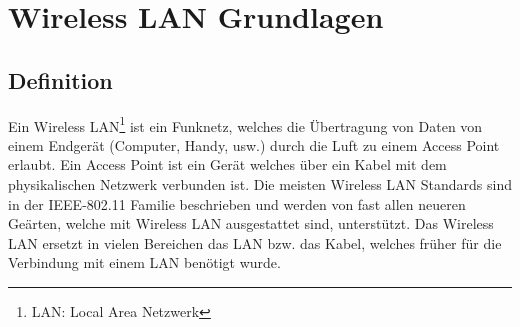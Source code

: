 \chapter{Wireless LAN Grundlagen}
\label{sec:TheoretischeGrundlagen}

\section{Definition}
Ein Wireless LAN\footnote{LAN: Local Area Netzwerk} ist ein Funknetz, welches die Übertragung von Daten von einem Endgerät (Computer, Handy, usw.) durch die Luft zu einem Access Point erlaubt. Ein Access Point ist ein Gerät welches über ein Kabel mit dem physikalischen Netzwerk verbunden ist. Die meisten Wireless LAN Standards sind in der IEEE-802.11 Familie beschrieben und werden von fast allen neueren Geärten, welche mit Wireless LAN ausgestattet sind, unterstützt. Das Wireless LAN ersetzt in vielen Bereichen das LAN bzw. das Kabel, welches früher für die Verbindung mit einem LAN benötigt wurde.


